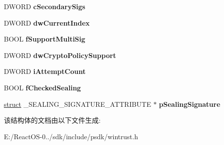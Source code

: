 \begin{DoxyCompactItemize}
D\+W\+O\+RD {\bfseries c\+Secondary\+Sigs}
\item 
\mbox{\label{struct___c_r_y_p_t___p_r_o_v_i_d_e_r___s_i_g_s_t_a_t_e_a7a8ad74ca936b668f1ab103b7344c173}} 
D\+W\+O\+RD {\bfseries dw\+Current\+Index}
\item 
\mbox{\label{struct___c_r_y_p_t___p_r_o_v_i_d_e_r___s_i_g_s_t_a_t_e_a1f8db6623878f199b08be4059327714f}} 
B\+O\+OL {\bfseries f\+Support\+Multi\+Sig}
\item 
\mbox{\label{struct___c_r_y_p_t___p_r_o_v_i_d_e_r___s_i_g_s_t_a_t_e_a58b505eb23df986549b5b1748f1798ae}} 
D\+W\+O\+RD {\bfseries dw\+Crypto\+Policy\+Support}
\item 
\mbox{\label{struct___c_r_y_p_t___p_r_o_v_i_d_e_r___s_i_g_s_t_a_t_e_a1cf36ab99ad249467e0f9b660179c329}} 
D\+W\+O\+RD {\bfseries i\+Attempt\+Count}
\item 
\mbox{\label{struct___c_r_y_p_t___p_r_o_v_i_d_e_r___s_i_g_s_t_a_t_e_aac7842fe626398917fefed80fd25afad}} 
B\+O\+OL {\bfseries f\+Checked\+Sealing}
\item 
\mbox{\label{struct___c_r_y_p_t___p_r_o_v_i_d_e_r___s_i_g_s_t_a_t_e_a785d7fa8014d971779867b1f9248b77a}} 
\hyperlink{interfacestruct}{struct} \+\_\+\+S\+E\+A\+L\+I\+N\+G\+\_\+\+S\+I\+G\+N\+A\+T\+U\+R\+E\+\_\+\+A\+T\+T\+R\+I\+B\+U\+TE $\ast$ {\bfseries p\+Sealing\+Signature}
\end{DoxyCompactItemize}


该结构体的文档由以下文件生成\+:\begin{DoxyCompactItemize}
\item 
E\+:/\+React\+O\+S-\/0../sdk/include/psdk/wintrust.\+h\end{DoxyCompactItemize}
